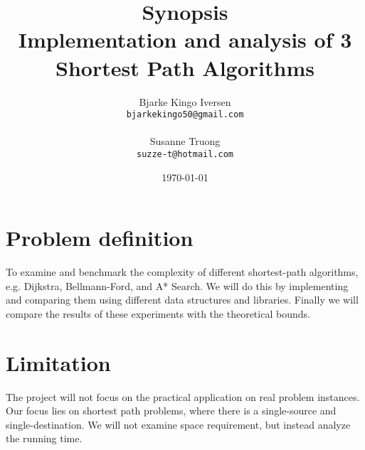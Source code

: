 \documentclass[11pt]{article}
\title{
  \vspace{3cm}
  \Huge{Synopsis} \\
  \Large{Implementation and analysis of 3 Shortest Path Algorithms}
}
\author{
  \Large{Bjarke Kingo Iversen}
  \\ \texttt{bjarkekingo50@gmail.com} \\\\
  \Large{Susanne Truong}
  \\ \texttt{suzze-t@hotmail.com}
}
\date{
    \today
}
\def \ColourPDF {include/ku-farve}
\def \TitlePDF   {include/ku-en}  %
\begin{document}


\clearpage\maketitle
\thispagestyle{empty}

\newpage

\section{Problem definition}
To examine and benchmark the complexity of different shortest-path algorithms, e.g. Dijkstra, Bellmann-Ford, and A* Search. We will do this by implementing and comparing them using different data structures and libraries. Finally we will compare the results of these experiments with the theoretical bounds.
\section{Limitation}
The project will not focus on the practical application on real problem instances. Our focus lies on shortest path problems, where there is a single-source and single-destination. We will not examine space requirement, but instead analyze the running time.
\end{document}

